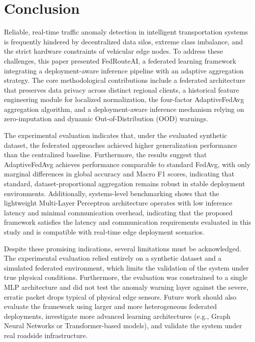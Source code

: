 \section{Conclusion}
\label{sec:conclusion}

Reliable, real-time traffic anomaly detection in intelligent transportation systems is frequently hindered by decentralized data silos, extreme class imbalance, and the strict hardware constraints of vehicular edge nodes. To address these challenges, this paper presented FedRouteAI, a federated learning framework integrating a deployment-aware inference pipeline with an adaptive aggregation strategy. The core methodological contributions include a federated architecture that preserves data privacy across distinct regional clients, a historical feature engineering module for localized normalization, the four-factor AdaptiveFedAvg aggregation algorithm, and a deployment-aware inference mechanism relying on zero-imputation and dynamic Out-of-Distribution (OOD) warnings.

The experimental evaluation indicates that, under the evaluated synthetic dataset, the federated approaches achieved higher generalization performance than the centralized baseline. Furthermore, the results suggest that AdaptiveFedAvg achieves performance comparable to standard FedAvg, with only marginal differences in global accuracy and Macro F1 scores, indicating that standard, dataset-proportional aggregation remains robust in stable deployment environments. Additionally, systems-level benchmarking shows that the lightweight Multi-Layer Perceptron architecture operates with low inference latency and minimal communication overhead, indicating that the proposed framework satisfies the latency and communication requirements evaluated in this study and is compatible with real-time edge deployment scenarios.

Despite these promising indications, several limitations must be acknowledged. The experimental evaluation relied entirely on a synthetic dataset and a simulated federated environment, which limits the validation of the system under true physical conditions. Furthermore, the evaluation was constrained to a single MLP architecture and did not test the anomaly warning layer against the severe, erratic packet drops typical of physical edge sensors. Future work should also evaluate the framework using larger and more heterogeneous federated deployments, investigate more advanced learning architectures (e.g., Graph Neural Networks or Transformer-based models), and validate the system under real roadside infrastructure.
